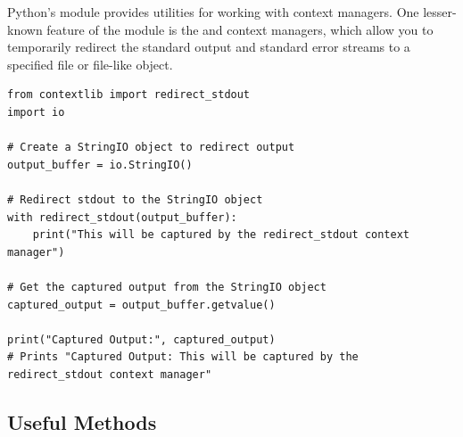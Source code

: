 Python's  module provides utilities for working with context managers. One lesser-known feature of the  module is the  and  context managers, which allow you to temporarily redirect the standard output and standard error streams to a specified file or file-like object.
\begin{lstlisting}
from contextlib import redirect_stdout
import io

# Create a StringIO object to redirect output
output_buffer = io.StringIO()

# Redirect stdout to the StringIO object
with redirect_stdout(output_buffer):
    print("This will be captured by the redirect_stdout context manager")

# Get the captured output from the StringIO object
captured_output = output_buffer.getvalue()

print("Captured Output:", captured_output)
# Prints "Captured Output: This will be captured by the redirect_stdout context manager"
\end{lstlisting}


























\subsection{Useful Methods}












